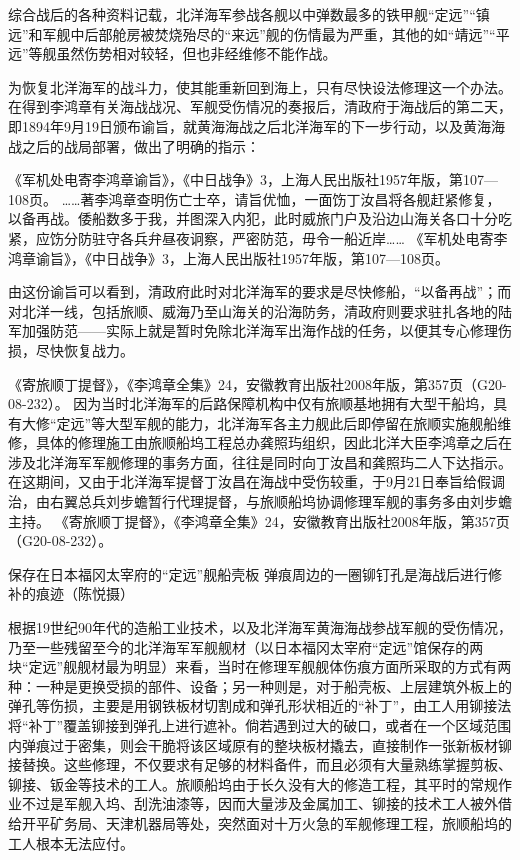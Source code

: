 \documentclass[12pt,UTF8]{ctexbook}
\begin{document}
综合战后的各种资料记载，北洋海军参战各舰以中弹数最多的铁甲舰“定远”“镇远”和军舰中后部舱房被焚烧殆尽的“来远”舰的伤情最为严重，其他的如“靖远”“平远”等舰虽然伤势相对较轻，但也非经维修不能作战。

为恢复北洋海军的战斗力，使其能重新回到海上，只有尽快设法修理这一个办法。在得到李鸿章有关海战战况、军舰受伤情况的奏报后，清政府于海战后的第二天，即1894年9月19日颁布谕旨，就黄海海战之后北洋海军的下一步行动，以及黄海海战之后的战局部署，做出了明确的指示：

《军机处电寄李鸿章谕旨》，《中日战争》3，上海人民出版社1957年版，第107—108页。
……著李鸿章查明伤亡士卒，请旨优恤，一面饬丁汝昌将各舰赶紧修复，以备再战。倭船数多于我，并图深入内犯，此时威旅门户及沿边山海关各口十分吃紧，应饬分防驻守各兵弁昼夜诇察，严密防范，毋令一船近岸…… 《军机处电寄李鸿章谕旨》，《中日战争》3，上海人民出版社1957年版，第107—108页。

由这份谕旨可以看到，清政府此时对北洋海军的要求是尽快修船，“以备再战”；而对北洋一线，包括旅顺、威海乃至山海关的沿海防务，清政府则要求驻扎各地的陆军加强防范——实际上就是暂时免除北洋海军出海作战的任务，以便其专心修理伤损，尽快恢复战力。

《寄旅顺丁提督》，《李鸿章全集》24，安徽教育出版社2008年版，第357页（G20-08-232）。
因为当时北洋海军的后路保障机构中仅有旅顺基地拥有大型干船坞，具有大修“定远”等大型军舰的能力，北洋海军各主力舰此后即停留在旅顺实施舰船维修，具体的修理施工由旅顺船坞工程总办龚照玙组织，因此北洋大臣李鸿章之后在涉及北洋海军军舰修理的事务方面，往往是同时向丁汝昌和龚照玙二人下达指示。在这期间，又由于北洋海军提督丁汝昌在海战中受伤较重，于9月21日奉旨给假调治，由右翼总兵刘步蟾暂行代理提督，与旅顺船坞协调修理军舰的事务多由刘步蟾主持。 《寄旅顺丁提督》，《李鸿章全集》24，安徽教育出版社2008年版，第357页（G20-08-232）。


保存在日本福冈太宰府的“定远”舰船壳板 弹痕周边的一圈铆钉孔是海战后进行修补的痕迹（陈悦摄）

根据19世纪90年代的造船工业技术，以及北洋海军黄海海战参战军舰的受伤情况，乃至一些残留至今的北洋海军军舰舰材（以日本福冈太宰府“定远”馆保存的两块“定远”舰舰材最为明显）来看，当时在修理军舰舰体伤痕方面所采取的方式有两种：一种是更换受损的部件、设备；另一种则是，对于船壳板、上层建筑外板上的弹孔等伤损，主要是用钢铁板材切割成和弹孔形状相近的“补丁”，由工人用铆接法将“补丁”覆盖铆接到弹孔上进行遮补。倘若遇到过大的破口，或者在一个区域范围内弹痕过于密集，则会干脆将该区域原有的整块板材撬去，直接制作一张新板材铆接替换。这些修理，不仅要求有足够的材料备件，而且必须有大量熟练掌握剪板、铆接、钣金等技术的工人。旅顺船坞由于长久没有大的修造工程，其平时的常规作业不过是军舰入坞、刮洗油漆等，因而大量涉及金属加工、铆接的技术工人被外借给开平矿务局、天津机器局等处，突然面对十万火急的军舰修理工程，旅顺船坞的工人根本无法应付。
\end{document}
